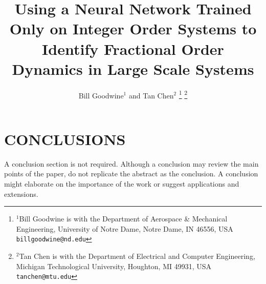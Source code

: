 \documentclass[letterpaper, 10 pt, conference]{ieeeconf}  %
\title{\LARGE \bf
Using a Neural Network Trained Only on Integer Order Systems to Identify
Fractional Order Dynamics in Large Scale Systems}
\author{Bill Goodwine$^{1}$ and Tan Chen$^{2}$%
\thanks{$^{1}$Bill Goodwine is with the Department of Aerospace \& Mechanical
  Engineering, University of Notre Dame, Notre Dame, IN 46556, USA
{\tt\small billgoodwine@nd.edu}}%
\thanks{$^{2}$Tan Chen is with the Department of Electrical and Computer
Engineering, Michigan Technological University, Houghton, MI 49931, USA
{\tt\small tanchen@mtu.edu}}
}
\begin{document}
\maketitle
\thispagestyle{empty}
\pagestyle{empty}







\section{CONCLUSIONS}

A conclusion section is not required. Although a conclusion may review the main
points of the paper, do not replicate the abstract as the conclusion. A
conclusion might elaborate on the importance of the work or suggest applications
and extensions. 




\end{document}
